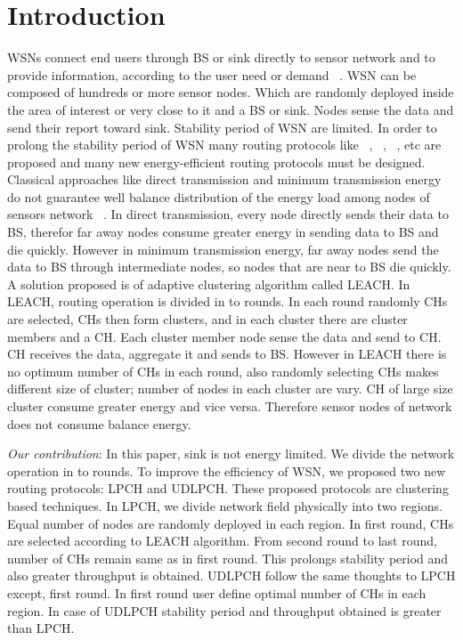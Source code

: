 \documentclass[journal]{IEEEtran}
\begin{document}
\section{Introduction}

WSNs connect end users through BS or sink directly to sensor network and to provide information, according to the user need or demand ~\cite{R1}. WSN can be composed of hundreds or more sensor nodes. Which are randomly deployed inside the area of interest or very close to it and a BS or sink. Nodes sense the data and send their report toward sink. Stability period of WSN are limited. In order to prolong the stability period of WSN many routing protocols like ~\cite{R2}, ~\cite{R3}, ~\cite{R4}, etc are proposed and many new energy-efficient routing protocols must be designed. Classical approaches like direct transmission and minimum transmission energy do not guarantee well balance distribution of the energy load among nodes of sensors network ~\cite{R5}. In direct transmission, every node directly sends their data to BS, therefor far away nodes consume greater energy in sending data to BS and die quickly. However in minimum transmission energy, far away nodes send the data to BS through intermediate nodes, so nodes that are near to BS die quickly. A solution proposed is of adaptive clustering algorithm called LEACH. In LEACH, routing operation is divided in to rounds. In each round randomly CHs are selected, CHs then form clusters, and in each cluster there are cluster members and a CH. Each cluster member node sense the data and send to CH. CH receives the data, aggregate it and sends to BS. However in LEACH there is no optimum number of CHs in each round, also randomly selecting CHs makes different size of cluster; number of nodes in each cluster are vary. CH of large size cluster consume greater energy and vice versa. Therefore sensor nodes of network does not consume balance energy.

\textit{Our contribution}: In this paper, sink is not energy limited. We divide the network operation in to rounds. To improve the efficiency of WSN, we proposed two new routing protocols: LPCH and UDLPCH. These proposed protocols are clustering based techniques. In LPCH, we divide network field physically into two regions. Equal number of nodes are randomly deployed in each region. In first round, CHs are selected according to LEACH algorithm. From second round to last round, number of CHs remain same as in first round. This prolongs stability period and also greater throughput is obtained. UDLPCH follow the same thoughts to LPCH except, first round. In first round user define optimal number of CHs in each region. In case of UDLPCH stability period and throughput obtained is greater than LPCH.
\end{document}
